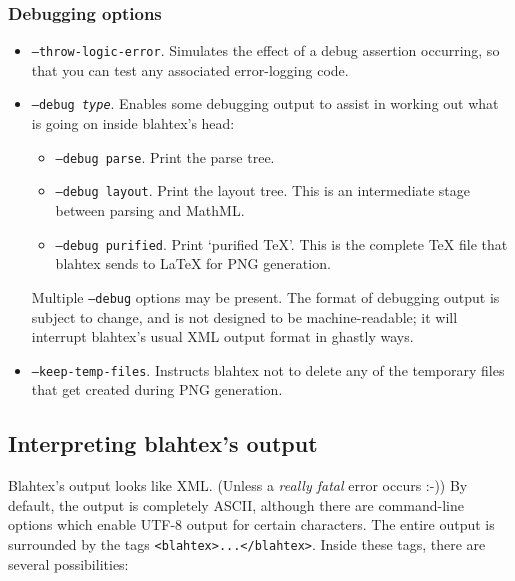 \documentclass{article}
\begin{document}
\subsubsection{Debugging options}

\begin{itemize}
\item \texttt{--throw-logic-error}. Simulates the effect of a debug assertion occurring, so that you can test any associated error-logging code.
\item \texttt{--debug \textit{type}}. Enables some debugging output to assist in working out what is going on inside blahtex's head:
\begin{itemize}
\item \texttt{--debug parse}. Print the parse tree.
\item \texttt{--debug layout}. Print the layout tree. This is an intermediate stage between parsing and MathML.
\item \texttt{--debug purified}. Print `purified \TeX{}'. This is the complete \TeX{} file that blahtex sends to \LaTeX{} for PNG generation.
\end{itemize}
Multiple \texttt{--debug} options may be present. The format of debugging output is subject to change, and is not designed to be machine-readable; it will interrupt blahtex's usual XML output format in ghastly ways.
\item \texttt{--keep-temp-files}. Instructs blahtex not to delete any of the temporary files that get created during PNG generation.
\end{itemize}

\subsection{Interpreting blahtex's output}\label{sec:interpreting-output}

Blahtex's output looks like XML. (Unless a \emph{really fatal} error occurs :-)) By default, the output is completely ASCII, although there are command-line options which enable UTF-8 output for certain characters. The entire output is surrounded by the tags \texttt{<blahtex>...</blahtex>}. Inside these tags, there are several possibilities:
\end{document}

